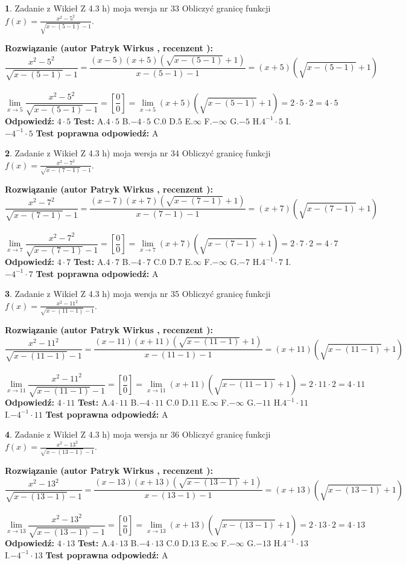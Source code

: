 \documentclass[12pt, a4paper]{article}
\theoremstyle{definition} %
\newtheorem{zad}{}
\newcommand{\zadStart}[1]{\begin{zad}#1\newline}
\newcommand{\zadStop}{\end{zad}}
\newcommand{\rozwStart}[2]{\noindent \textbf{Rozwiązanie (autor #1 , recenzent #2): }\newline}
\newcommand{\rozwStop}{\newline}
\newcommand{\odpStart}{\noindent \textbf{Odpowiedź:}\newline}
\newcommand{\odpStop}{\newline}
\newcommand{\testStart}{\noindent \textbf{Test:}\newline}
\newcommand{\testStop}{\newline}
\newcommand{\kluczStart}{\noindent \textbf{Test poprawna odpowiedź:}\newline}
\newcommand{\kluczStop}{\newline}
\begin{document}
\zadStart{Zadanie z Wikieł Z 4.3 h) moja wersja nr 33}
Obliczyć granicę funkcji $f(x)=\frac{x^{2} - 5^{2}}{\sqrt{x-(5-1)}-1}$.
\zadStop
\rozwStart{Patryk Wirkus}{}
$$\frac{x^{2} - 5^{2}}{\sqrt{x-(5-1)}-1}=\frac{(x-5)(x+5)(\sqrt{x-(5-1)}+1)}{x-(5-1)-1}=(x+5)(\sqrt{x-(5-1)}+1)$$
\\
$$\lim\limits_{x\to 5}\frac{x^{2} - 5^{2}}{\sqrt{x-(5-1)}-1}=[\frac{0}{0}]=
\lim\limits_{x\to 5}(x+5)(\sqrt{x-(5-1)}+1) = 2\cdot5 \cdot 2 = 4 \cdot 5$$
\rozwStop
\odpStart
$4\cdot5$
\odpStop
\testStart
A.$4\cdot5$
B.$-4\cdot5$
C.$0$
D.$5$
E.$\infty$
F.$-\infty$
G.$-5$
H.$4^{-1}\cdot5$
I.$-4^{-1}\cdot5$
\testStop
\kluczStart
A
\kluczStop



\zadStart{Zadanie z Wikieł Z 4.3 h) moja wersja nr 34}
Obliczyć granicę funkcji $f(x)=\frac{x^{2} - 7^{2}}{\sqrt{x-(7-1)}-1}$.
\zadStop
\rozwStart{Patryk Wirkus}{}
$$\frac{x^{2} - 7^{2}}{\sqrt{x-(7-1)}-1}=\frac{(x-7)(x+7)(\sqrt{x-(7-1)}+1)}{x-(7-1)-1}=(x+7)(\sqrt{x-(7-1)}+1)$$
\\
$$\lim\limits_{x\to 7}\frac{x^{2} - 7^{2}}{\sqrt{x-(7-1)}-1}=[\frac{0}{0}]=
\lim\limits_{x\to 7}(x+7)(\sqrt{x-(7-1)}+1) = 2\cdot7 \cdot 2 = 4 \cdot 7$$
\rozwStop
\odpStart
$4\cdot7$
\odpStop
\testStart
A.$4\cdot7$
B.$-4\cdot7$
C.$0$
D.$7$
E.$\infty$
F.$-\infty$
G.$-7$
H.$4^{-1}\cdot7$
I.$-4^{-1}\cdot7$
\testStop
\kluczStart
A
\kluczStop



\zadStart{Zadanie z Wikieł Z 4.3 h) moja wersja nr 35}
Obliczyć granicę funkcji $f(x)=\frac{x^{2} - 11^{2}}{\sqrt{x-(11-1)}-1}$.
\zadStop
\rozwStart{Patryk Wirkus}{}
$$\frac{x^{2} - 11^{2}}{\sqrt{x-(11-1)}-1}=\frac{(x-11)(x+11)(\sqrt{x-(11-1)}+1)}{x-(11-1)-1}=(x+11)(\sqrt{x-(11-1)}+1)$$
\\
$$\lim\limits_{x\to 11}\frac{x^{2} - 11^{2}}{\sqrt{x-(11-1)}-1}=[\frac{0}{0}]=
\lim\limits_{x\to 11}(x+11)(\sqrt{x-(11-1)}+1) = 2\cdot11 \cdot 2 = 4 \cdot 11$$
\rozwStop
\odpStart
$4\cdot11$
\odpStop
\testStart
A.$4\cdot11$
B.$-4\cdot11$
C.$0$
D.$11$
E.$\infty$
F.$-\infty$
G.$-11$
H.$4^{-1}\cdot11$
I.$-4^{-1}\cdot11$
\testStop
\kluczStart
A
\kluczStop



\zadStart{Zadanie z Wikieł Z 4.3 h) moja wersja nr 36}
Obliczyć granicę funkcji $f(x)=\frac{x^{2} - 13^{2}}{\sqrt{x-(13-1)}-1}$.
\zadStop
\rozwStart{Patryk Wirkus}{}
$$\frac{x^{2} - 13^{2}}{\sqrt{x-(13-1)}-1}=\frac{(x-13)(x+13)(\sqrt{x-(13-1)}+1)}{x-(13-1)-1}=(x+13)(\sqrt{x-(13-1)}+1)$$
\\
$$\lim\limits_{x\to 13}\frac{x^{2} - 13^{2}}{\sqrt{x-(13-1)}-1}=[\frac{0}{0}]=
\lim\limits_{x\to 13}(x+13)(\sqrt{x-(13-1)}+1) = 2\cdot13 \cdot 2 = 4 \cdot 13$$
\rozwStop
\odpStart
$4\cdot13$
\odpStop
\testStart
A.$4\cdot13$
B.$-4\cdot13$
C.$0$
D.$13$
E.$\infty$
F.$-\infty$
G.$-13$
H.$4^{-1}\cdot13$
I.$-4^{-1}\cdot13$
\testStop
\kluczStart
A
\kluczStop
\end{document}
